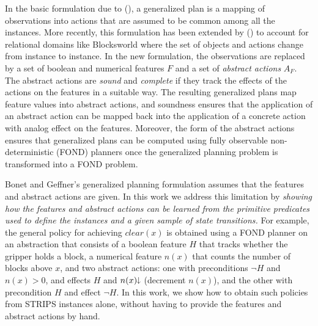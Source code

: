\documentclass[letterpaper]{article} %
\newcommand{\Omit}[1]{}
\newcommand{\citeay}[1]{\citeauthor{#1} (\citeyear{#1})}
\newcommand{\mminus}{\hspace{-.05em}\raisebox{.15ex}{\footnotesize$\downarrow$}}
\begin{document}
In the basic formulation due  to \citeay{hu:generalized}, a generalized plan
is a mapping of observations into actions that are assumed to be common
among  all the instances. More recently, this formulation has been extended by
\citeay{bonet:ijcai2018} to account for relational domains like Blocksworld  where the set of
objects and  actions change from instance to instance.
In the new formulation, the observations  are replaced by  a set of boolean
and numerical features $F$ and a set of \emph{abstract actions} $A_F$.
The  abstract actions are  \emph{sound} and \emph{complete} if they track the
effects  of the actions on  the features in a suitable way.
The resulting generalized plans  map feature values into abstract actions, and soundness
ensures that the application of an abstract action can be mapped back into the application of
a concrete action with analog effect  on  the features. Moreover, the form of the abstract actions
ensures that generalized plans can be computed using fully observable non-deterministic (FOND) planners
once the generalized planning problem is transformed into a FOND problem.

\Omit{
Abstract actions can increase or decrease numerical variables  $n$
associated with the numerical features (e.g., number of blocks above $x$), and while
increments  are transformed into deterministic propositional  effects $n > 0$ where $n > 0$ is
the negation of the proposition $n=0$, decrements  are  transformed  into
non-deterministic (disjunctive)  propositional effects $n > 0 \, | \, n=0$. 
}

Bonet and Geffner's generalized planning formulation assumes that the
features and abstract actions are given. In this work we address this limitation
by  \emph{showing  how the features and abstract actions  can be learned from
the primitive predicates used to define the instances and a given sample of state transitions.}
For example,  the general policy for achieving $clear(x)$ %
is obtained using a FOND planner on an abstraction that consists of  a  boolean
feature $H$  that tracks whether the gripper holds a block,  a numerical feature
$n(x)$ that counts the number of blocks above $x$, and two abstract actions:
one with preconditions $\neg H$ and $n(x) > 0$, and effects $H$ and $n(x)\mminus$
(decrement $n(x)$), and the other with precondition $H$ and effect $\neg H$.
In this work, we show how to obtain such policies from STRIPS instances alone,
without having to provide the features and abstract actions by hand.
\end{document}
